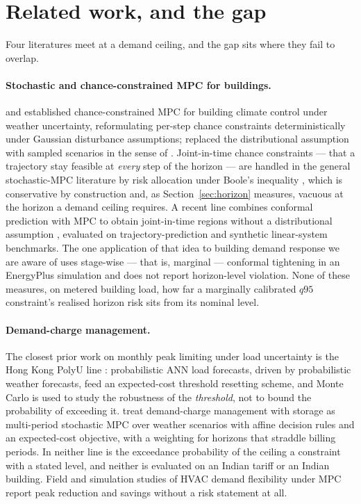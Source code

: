 \section{Related work, and the gap}
\label{sec:related}

Four literatures meet at a demand ceiling, and the gap sits where they fail to
overlap.

\paragraph{Stochastic and chance-constrained MPC for buildings.}
\citet{oldewurtel2012} and \citet{oldewurtel2014} established chance-constrained
MPC for building climate control under weather uncertainty, reformulating
per-step chance constraints deterministically under Gaussian disturbance
assumptions; \citet{zhang2013scenario} replaced the distributional assumption with
sampled scenarios in the sense of \citet{calafiore2006scenario}. Joint-in-time
chance constraints --- that a trajectory stay feasible at \emph{every} step of
the horizon --- are handled in the general stochastic-MPC literature by risk
allocation under Boole's inequality \citep{ono2008risk,paulson2017joint},
which is conservative by construction and, as Section~\ref{sec:horizon}
measures, vacuous at the horizon a demand ceiling requires. A recent line
combines conformal prediction with MPC to obtain joint-in-time regions without
a distributional assumption \citep{lindemann2023safe,vogel2025conformalmpc},
evaluated on trajectory-prediction and synthetic linear-system benchmarks. The
one application of that idea to building demand response we are aware of
\citep{xu2026e2edpc} uses stage-wise --- that is, marginal --- conformal
tightening in an EnergyPlus simulation and does not report horizon-level
violation. None of these measures, on metered building load, how far a
marginally calibrated $q95$ constraint's realised horizon risk sits from its
nominal level.

\paragraph{Demand-charge management.} The closest prior work on monthly peak
limiting under load uncertainty is the Hong Kong PolyU line
\citep{xu2019adaptive,xu2020exploration}: probabilistic ANN load forecasts,
driven by probabilistic weather forecasts, feed an expected-cost threshold
resetting scheme, and Monte Carlo is used to study the robustness of the
\emph{threshold}, not to bound the probability of exceeding it.
\citet{flamm2020peak} treat demand-charge management with storage as
multi-period stochastic MPC over weather scenarios with affine decision rules
and an expected-cost objective, with a weighting for horizons that straddle
billing periods. In neither line is the exceedance probability of the ceiling
a constraint with a stated level, and neither is evaluated on an Indian tariff
or an Indian building. Field and simulation studies of HVAC demand flexibility
under MPC report peak reduction and savings without a risk statement at all.

